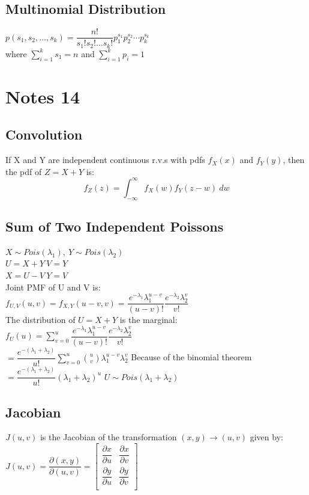 \documentclass[openany]{book}
\begin{document}
\section{Multinomial Distribution}
$p(s_1,s_2,\dots,s_k)=\dfrac{n!}{s_1!s_2!\dots s_k!}p_1^{s_1}p_2^{s_2}\cdots p_k^{s_k}$\\
where $\sum_{i=1}^{k}s_1=n$ and $\sum_{i=1}^{k}p_i=1$\\

\chapter{Notes 14}
\section{Convolution}
If X and Y are independent continuous r.v.s with pdfs $f_X(x)$ and $f_Y(y)$, then the pdf of $Z=X+Y$ is:
\[f_Z(z)=\int_{-\infty}^{\infty}f_X(w)f_Y(z-w)\ dw
\]
\section{Sum of Two Independent Poissons}
$X\sim Pois(\lambda_1), \ Y\sim Pois(\lambda_2)$\\
$U=X+Y \ V=Y$\\
$X=U-V \ Y=V$\\
Joint PMF of U and V is:\\
$f_{U,V}(u,v)=f_{X,Y}(u-v,v)=\dfrac{e^{-\lambda_1}\lambda_1^{u-v}}{(u-v)!}\dfrac{e^{-\lambda_2}\lambda_2^v}{v!}$\\
The distribution of $U=X+Y$ is the marginal:\\
$f_U(u)=\sum_{v=0}^{u}\dfrac{e^{-\lambda_1}\lambda_1^{u-v}}{(u-v)!}\dfrac{e^{-\lambda_2}\lambda_2^v}{v!}$\\
$=\dfrac{e^{-(\lambda_1+\lambda_2)}}{u!}\sum_{v=0}^{u} {u \choose v}\lambda_1^{u-v}\lambda_2^v$\medbreak
Because of the binomial theorem\medbreak
$=\dfrac{e^{-(\lambda_1+\lambda_2)}}{u!}(\lambda_1+\lambda_2)^u$\medbreak
$U\sim Pois(\lambda_1+\lambda_2)$
\section{Jacobian}
$J(u,v)$ is the Jacobian of the transformation $(x,y)\to (u,v)$ given by:\medbreak
$J(u,v)=\dfrac{\partial(x,y)}{\partial(u,v)}=
\begin{bmatrix}
\dfrac{\partial x}{\partial u}& \dfrac{\partial x}{\partial v}\\
\dfrac{\partial y}{\partial u}& \dfrac{\partial y}{\partial v}\\
\end{bmatrix}$
\end{document}
